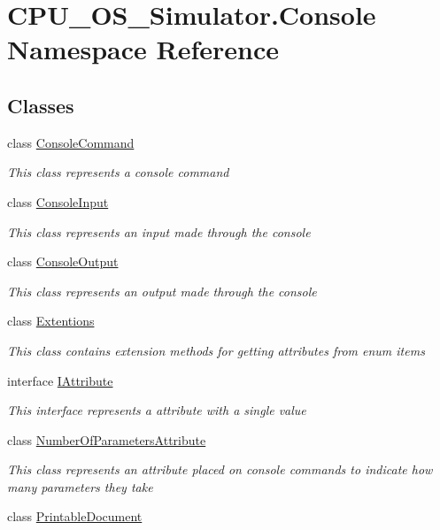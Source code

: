 \hypertarget{namespace_c_p_u___o_s___simulator_1_1_console}{}\section{C\+P\+U\+\_\+\+O\+S\+\_\+\+Simulator.\+Console Namespace Reference}
\label{namespace_c_p_u___o_s___simulator_1_1_console}
\subsection*{Classes}
\begin{DoxyCompactItemize}
\item 
class \hyperlink{class_c_p_u___o_s___simulator_1_1_console_1_1_console_command}{Console\+Command}
\begin{DoxyCompactList}\small\item\em This class represents a console command \end{DoxyCompactList}\item 
class \hyperlink{class_c_p_u___o_s___simulator_1_1_console_1_1_console_input}{Console\+Input}
\begin{DoxyCompactList}\small\item\em This class represents an input made through the console \end{DoxyCompactList}\item 
class \hyperlink{class_c_p_u___o_s___simulator_1_1_console_1_1_console_output}{Console\+Output}
\begin{DoxyCompactList}\small\item\em This class represents an output made through the console \end{DoxyCompactList}\item 
class \hyperlink{class_c_p_u___o_s___simulator_1_1_console_1_1_extentions}{Extentions}
\begin{DoxyCompactList}\small\item\em This class contains extension methods for getting attributes from enum items \end{DoxyCompactList}\item 
interface \hyperlink{interface_c_p_u___o_s___simulator_1_1_console_1_1_i_attribute}{I\+Attribute}
\begin{DoxyCompactList}\small\item\em This interface represents a attribute with a single value \end{DoxyCompactList}\item 
class \hyperlink{class_c_p_u___o_s___simulator_1_1_console_1_1_number_of_parameters_attribute}{Number\+Of\+Parameters\+Attribute}
\begin{DoxyCompactList}\small\item\em This class represents an attribute placed on console commands to indicate how many parameters they take \end{DoxyCompactList}\item 
class \hyperlink{class_c_p_u___o_s___simulator_1_1_console_1_1_printable_document}{Printable\+Document}
\end{DoxyCompactItemize}
